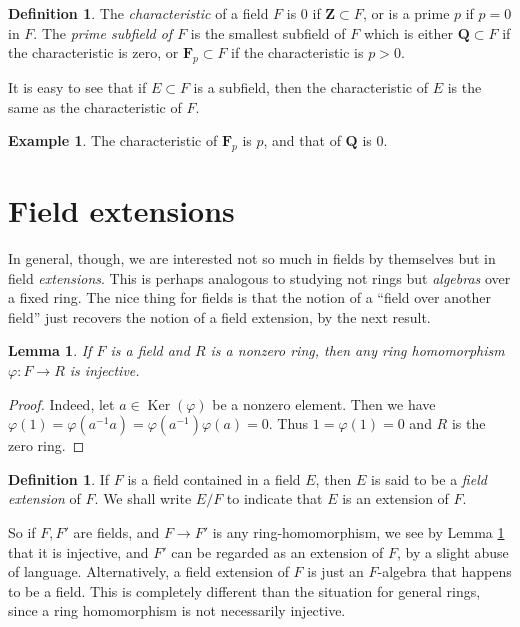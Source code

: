 \documentclass{stacks-project}
\theoremstyle{plain}
\newtheorem{lemma}[subsection]{Lemma}
\theoremstyle{definition}
\newtheorem{definition}[subsection]{Definition}
\newtheorem{example}[subsection]{Example}
\theoremstyle{remark}
\numberwithin{equation}{subsection}
\def\Ker{\mathop{\mathrm{Ker}}}
\begin{document}
\begin{definition}
\label{definition-characteristic}
The {\it characteristic} of a field $F$ is $0$ if
$\mathbf{Z} \subset F$, or is a prime $p$ if $p = 0$ in $F$.
The {\it prime subfield of $F$} is the smallest subfield of $F$
which is either $\mathbf{Q} \subset F$ if the characteristic is zero, or
$\mathbf{F}_p \subset F$ if the characteristic is $p > 0$.
\end{definition}

\noindent
It is easy to see that if $E \subset F$ is a subfield, then the
characteristic of $E$ is the same as the characteristic of $F$.

\begin{example}
\label{example-characteristic}
The characteristic of $\mathbf{F}_p$ is $p$, and that of $\mathbf{Q}$ is $0$.
\end{example}


\section{Field extensions}
\label{section-extensions}

\noindent
In general, though, we are interested not so much in fields by themselves but
in field {\it extensions}. This is perhaps analogous to studying not rings
but {\it algebras} over a fixed ring.
The nice thing for fields is that the notion of a ``field over another field''
just recovers the notion of a field extension, by the next result.

\begin{lemma}
\label{lemma-field-maps-injective}
If $F$ is a field and $R$ is a nonzero ring, then any ring homomorphism
$\varphi : F \to R$ is injective.
\end{lemma}

\begin{proof}
Indeed, let $a \in \Ker(\varphi)$ be a nonzero element. Then we have
$\varphi(1) = \varphi(a^{-1} a) = \varphi(a^{-1}) \varphi(a) = 0$.
Thus $1 = \varphi(1) = 0$ and $R$ is the zero ring.
\end{proof}

\begin{definition}
\label{definition-extension}
If $F$ is a field contained in a field $E$, then $E$ is said
to be a {\it field extension} of $F$. We shall write $E/F$ to indicate
that $E$ is an extension of $F$.
\end{definition}

\noindent
So if $F, F'$ are fields, and $F \to F'$ is any ring-homomorphism, we see by
Lemma \ref{lemma-field-maps-injective} that it is injective, and $F'$ can be
regarded as an extension of $F$, by a slight abuse of language. Alternatively,
a field extension of $F$ is just an $F$-algebra that happens to be a field.
This is completely different than the situation for general rings, since a
ring homomorphism is not necessarily injective.
\end{document}
